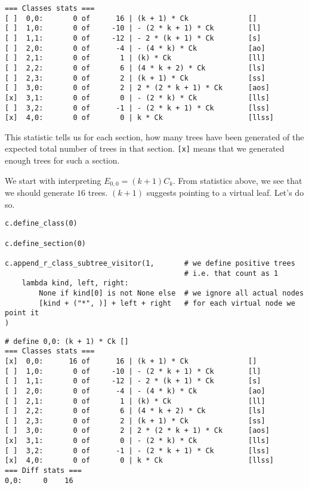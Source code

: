 \documentclass[final]{article}
\theoremstyle{definition}
\theoremstyle{definition}
\theoremstyle{remark}
\begin{document}
\begin{lstlisting}
=== Classes stats ===
[ ]  0,0:       0 of      16 | (k + 1) * Ck              []
[ ]  1,0:       0 of     -10 | - (2 * k + 1) * Ck        [l]
[ ]  1,1:       0 of     -12 | - 2 * (k + 1) * Ck        [s]
[ ]  2,0:       0 of      -4 | - (4 * k) * Ck            [ao]
[ ]  2,1:       0 of       1 | (k) * Ck                  [ll]
[ ]  2,2:       0 of       6 | (4 * k + 2) * Ck          [ls]
[ ]  2,3:       0 of       2 | (k + 1) * Ck              [ss]
[ ]  3,0:       0 of       2 | 2 * (2 * k + 1) * Ck      [aos]
[x]  3,1:       0 of       0 | - (2 * k) * Ck            [lls]
[ ]  3,2:       0 of      -1 | - (2 * k + 1) * Ck        [lss]
[x]  4,0:       0 of       0 | k * Ck                    [llss]
\end{lstlisting}

This statistic tells us for each section, how many trees have been generated of the expected total number of trees in that section. \verb|[x]| means that we generated enough trees for such a section.

We start with interpreting \(E_{0,0} = (k + 1) C_k\). From statistics above, we see that we should generate \(16\) trees. \((k + 1)\) suggests pointing to a virtual leaf. Let's do so.

\begin{lstlisting}
c.define_class(0)

c.define_section(0)

c.append_r_class_subtree_visitor(1,       # we define positive trees
                                          # i.e. that count as 1
    lambda kind, left, right:
        None if kind[0] is not None else  # we ignore all actual nodes
        [kind + ("*", )] + left + right   # for each virtual node we point it
)
\end{lstlisting}

\begin{lstlisting}
# define 0,0: (k + 1) * Ck []
=== Classes stats ===
[x]  0,0:      16 of      16 | (k + 1) * Ck              []
[ ]  1,0:       0 of     -10 | - (2 * k + 1) * Ck        [l]
[ ]  1,1:       0 of     -12 | - 2 * (k + 1) * Ck        [s]
[ ]  2,0:       0 of      -4 | - (4 * k) * Ck            [ao]
[ ]  2,1:       0 of       1 | (k) * Ck                  [ll]
[ ]  2,2:       0 of       6 | (4 * k + 2) * Ck          [ls]
[ ]  2,3:       0 of       2 | (k + 1) * Ck              [ss]
[ ]  3,0:       0 of       2 | 2 * (2 * k + 1) * Ck      [aos]
[x]  3,1:       0 of       0 | - (2 * k) * Ck            [lls]
[ ]  3,2:       0 of      -1 | - (2 * k + 1) * Ck        [lss]
[x]  4,0:       0 of       0 | k * Ck                    [llss]
=== Diff stats ===
0,0:     0    16
\end{lstlisting}
\end{document}
